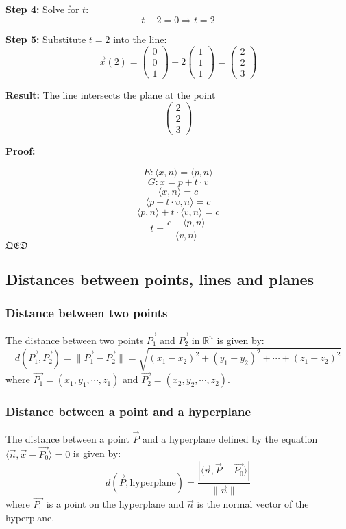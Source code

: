 \textbf{Step 4:} Solve for \( t \):
\[
	t - 2 = 0 \Rightarrow t = 2
\]

\textbf{Step 5:} Substitute \( t = 2 \) into the line:
\[
	\vec{x}(2) = \begin{pmatrix} 0 \\ 0 \\ 1 \end{pmatrix} + 2 \begin{pmatrix} 1 \\ 1 \\ 1 \end{pmatrix} =
	\begin{pmatrix} 2 \\ 2 \\ 3 \end{pmatrix}
\]

\textbf{Result:} The line intersects the plane at the point
\[
	\boxed{\begin{pmatrix} 2 \\ 2 \\ 3 \end{pmatrix}}
\]

\newpage
\textbf{Proof:}

\[
	E: \langle x, n\rangle = \langle p, n \rangle
\]
\[
	G: x = p + t \cdot v
\]
\[
	\langle x, n \rangle = c
\]
\[
	\langle p + t \cdot v, n \rangle = c
\]
\[
	\langle p, n \rangle + t \cdot \langle v, n \rangle = c
\]
\[
	t = \frac{c - \langle p, n \rangle}{\langle v, n \rangle}
\]
$\mathfrak{QED}$

\subsection{Distances between points, lines and planes}
\subsubsection*{Distance between two points}
The distance between two points $\vec{P_1}$ and $\vec{P_2}$ in $\mathbb{R}^n$ is given by:
\[
	d(\vec{P_1}, \vec{P_2}) = \|\vec{P_1} - \vec{P_2}\| = \sqrt{(x_1 - x_2)^2 + (y_1 - y_2)^2 + \cdots + (z_1 - z_2)^2}
\]
where $\vec{P_1} = (x_1, y_1, \cdots,z_1)$ and $\vec{P_2} = (x_2, y_2, \cdots,z_2)$.
\subsubsection*{Distance between a point and a hyperplane}
The distance between a point $\vec{P}$ and a hyperplane defined by the equation $\langle \vec{n}, \vec{x} - \vec{P_0} \rangle = 0$ is given by:
\[
	d(\vec{P}, \text{hyperplane}) = \frac{|\langle \vec{n}, \vec{P} - \vec{P_0} \rangle|}{\|\vec{n}\|}
\]
where $\vec{P_0}$ is a point on the hyperplane and $\vec{n}$ is the normal vector of the hyperplane.
